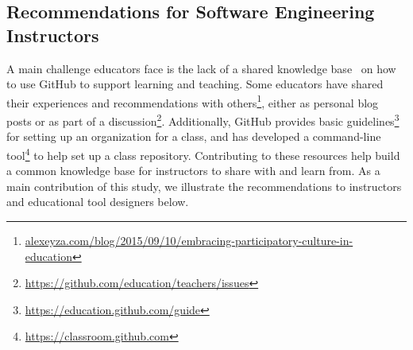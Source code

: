 \subsection{Recommendations for Software Engineering Instructors}

A main challenge educators face is the lack of a shared knowledge base~\cite{zagalsky2015emergence} on how to use GitHub to support learning and teaching. Some educators have shared their experiences and recommendations with others\footnote{\url{alexeyza.com/blog/2015/09/10/embracing-participatory-culture-in-education}}, either as personal blog posts or as part of a discussion\footnote{\url{https://github.com/education/teachers/issues}}. Additionally, GitHub provides basic guidelines\footnote{\url{https://education.github.com/guide}} for setting up an organization for a class, and has developed a command-line tool\footnote{\url{https://classroom.github.com}} to help set up a class repository. Contributing to these resources help build a common knowledge base for instructors to share with and learn from. As a main contribution of this study, we illustrate the recommendations to instructors and educational tool designers below.

